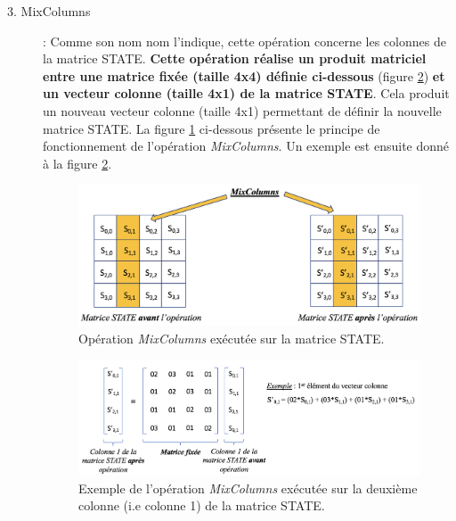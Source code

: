 \documentclass[10pt, oneside, a4paper]{article}
\begin{document}
\begin{description}
\item[3. MixColumns] : Comme son nom nom l'indique, cette opération concerne les colonnes de la matrice STATE. \textbf{Cette opération réalise un produit matriciel entre une matrice fixée (taille 4x4) définie ci-dessous} (figure \ref{fig:colonnebis}) \textbf{et un vecteur colonne (taille 4x1) de la matrice STATE}. Cela produit un nouveau vecteur colonne (taille 4x1) permettant de définir la nouvelle matrice STATE.
La figure \ref{fig:colonne} ci-dessous présente le principe de fonctionnement de l'opération \textit{MixColumns}. Un exemple est ensuite donné à la figure \ref{fig:colonnebis}.
\begin{figure}[htbp]
    \centering
    \includegraphics[scale=0.42]{image/colonne}
    \caption{Opération \textit{MixColumns} exécutée sur la matrice STATE.}
    \label{fig:colonne}
\end{figure}
\begin{figure}[htbp]
    \centering
    \includegraphics[scale=0.54]{image/colonnebis}
    \caption{Exemple de l'opération \textit{MixColumns} exécutée sur la deuxième colonne (i.e colonne 1) de la matrice STATE.}
    \label{fig:colonnebis}
\end{figure}


\end{description}
\end{document}
